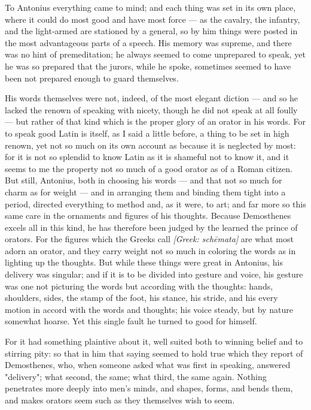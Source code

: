  To Antonius everything came to mind; and each thing was set in its own place, where it could do most good and have most force — as the cavalry, the infantry, and the light-armed are stationed by a general, so by him things were posted in the most advantageous parts of a speech. His memory was supreme, and there was no hint of premeditation; he always seemed to come unprepared to speak, yet he was so prepared that the jurors, while he spoke, sometimes seemed to have been not prepared enough to guard themselves.

 His words themselves were not, indeed, of the most elegant diction — and so he lacked the renown of speaking with nicety, though he did not speak at all foully — but rather of that kind which is the proper glory of an orator in his words. For to speak good Latin is itself, as I said a little before, a thing to be set in high renown, yet not so much on its own account as because it is neglected by most: for it is not so splendid to know Latin as it is shameful not to know it, and it seems to me the property not so much of a good orator as of a Roman citizen. But still, Antonius, both in choosing his words — and that not so much for charm as for weight — and in arranging them and binding them tight into a period, directed everything to method and, as it were, to art; and far more so this same care in the ornaments and figures of his thoughts. Because Demosthenes excels all in this kind, he has therefore been judged by the learned the prince of orators. For the figures which the Greeks call \textit{[Greek: schēmata]} are what most adorn an orator, and they carry weight not so much in coloring the words as in lighting up the thoughts. But while these things were great in Antonius, his delivery was singular; and if it is to be divided into gesture and voice, his gesture was one not picturing the words but according with the thoughts: hands, shoulders, sides, the stamp of the foot, his stance, his stride, and his every motion in accord with the words and thoughts; his voice steady, but by nature somewhat hoarse. Yet this single fault he turned to good for himself.

 For it had something plaintive about it, well suited both to winning belief and to stirring pity: so that in him that saying seemed to hold true which they report of Demosthenes, who, when someone asked what was first in speaking, answered "delivery"; what second, the same; what third, the same again. Nothing penetrates more deeply into men's minds, and shapes, forms, and bends them, and makes orators seem such as they themselves wish to seem.


